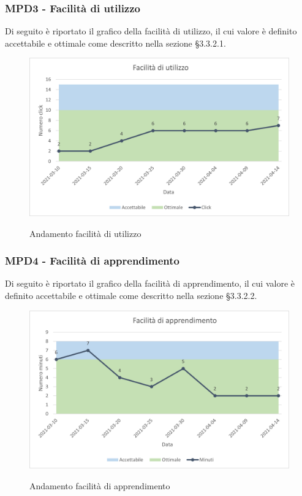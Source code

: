 \subsubsection{MPD3 - Facilità di utilizzo}
Di seguito è riportato il grafico della facilità di utilizzo, il cui valore è definito accettabile e ottimale come descritto nella sezione §3.3.2.1.\\

\begin{figure}[H]
\centering
\includegraphics[scale=0.78]{res/ResocontoAttivitaDiVerifica/res/metriche/grafici/img/FacilitaUtilizzo.png}\\
\caption{Andamento facilità di utilizzo}
\end{figure}

\subsubsection{MPD4 - Facilità di apprendimento}
Di seguito è riportato il grafico della facilità di apprendimento, il cui valore è definito accettabile e ottimale come descritto nella sezione §3.3.2.2.\\

\begin{figure}[H]
\centering
\includegraphics[scale=0.78]{res/ResocontoAttivitaDiVerifica/res/metriche/grafici/img/FacilitaApprendimento.png}\\
\caption{Andamento facilità di apprendimento}
\end{figure}


